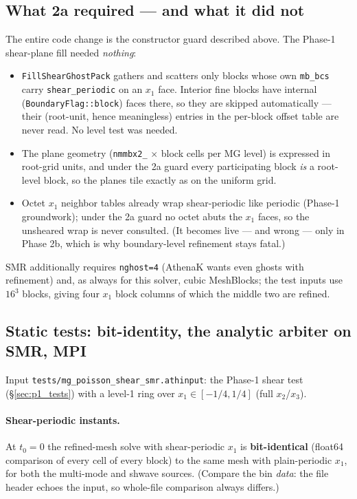\documentclass[11pt]{article}
\newcommand{\code}[1]{\texttt{#1}}
\begin{document}
\subsection{What 2a required --- and what it did not}
The entire code change is the constructor guard described above. The Phase-1
shear-plane fill needed \emph{nothing}:
\begin{itemize}
  \item \code{FillShearGhostPack} gathers and scatters only blocks whose own
        \code{mb\_bcs} carry \code{shear\_periodic} on an $x_1$ face. Interior fine
        blocks have internal (\code{BoundaryFlag::block}) faces there, so they are
        skipped automatically --- their (root-unit, hence meaningless) entries in the
        per-block offset table are never read. No level test was needed.
  \item The plane geometry (\code{nmmbx2\_} $\times$ block cells per MG level) is
        expressed in root-grid units, and under the 2a guard every participating
        block \emph{is} a root-level block, so the planes tile exactly as on the
        uniform grid.
  \item Octet $x_1$ neighbor tables already wrap shear-periodic like periodic
        (Phase-1 groundwork); under the 2a guard no octet abuts the $x_1$ faces, so
        the unsheared wrap is never consulted. (It becomes live --- and wrong --- only
        in Phase 2b, which is why boundary-level refinement stays fatal.)
\end{itemize}
SMR additionally requires \code{nghost=4} (AthenaK wants even ghosts with
refinement) and, as always for this solver, cubic MeshBlocks; the test inputs use
$16^3$ blocks, giving four $x_1$ block columns of which the middle two are refined.

\subsection{Static tests: bit-identity, the analytic arbiter on SMR, MPI}
\label{sec:p2a_static}
Input \code{tests/mg\_poisson\_shear\_smr.athinput}: the Phase-1 shear test
(\S\ref{sec:p1_tests}) with a level-1 ring over $x_1 \in [-1/4, 1/4]$ (full
$x_2$/$x_3$).

\paragraph{Shear-periodic instants.}
At $t_0 = 0$ the refined-mesh solve with shear-periodic $x_1$ is
\textbf{bit-identical} (float64 comparison of every cell of every block) to the same
mesh with plain-periodic $x_1$, for both the multi-mode and shwave sources. (Compare
the bin \emph{data}: the file header echoes the input, so whole-file comparison
always differs.)
\end{document}
